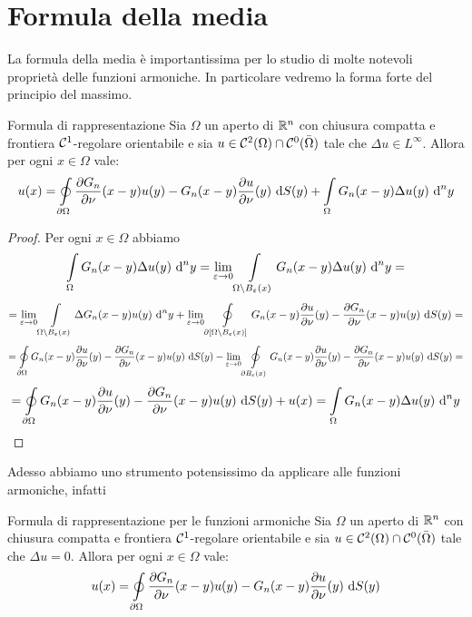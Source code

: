 \documentclass{book}
\begin{document}
\section{Formula della media}

La formula della media è importantissima per lo studio di molte notevoli proprietà delle funzioni armoniche. In particolare vedremo la forma forte del principio del massimo.

\begin{theorem}{Formula di rappresentazione}{}
    Sia $\Omega$ un aperto di $\mathbb{R}^n$ con chiusura compatta e frontiera $\mathcal{C}^1$-regolare orientabile e sia $u \in \mathcal{C}^2(\Omega)\cap\mathcal{C}^0(\bar{\Omega})$ tale che $\Delta u \in L^\infty$. Allora per ogni $x \in \Omega$ vale:
    \[u(x) = \oint\limits_{\partial\Omega} \frac{\partial G_n}{\partial \nu}(x-y) u(y) - G_n(x-y)\frac{\partial u}{\partial \nu}(y) \text{ d} S(y) + \int\limits_\Omega G_n(x-y)\Delta u(y)\text{ d}^n y\]
\end{theorem}
\begin{proof}
    Per ogni $x\in\Omega$ abbiamo
    \[\int\limits_\Omega G_n(x-y)\Delta u(y)\text{ d}^n y = \lim_{\varepsilon\to 0} \int\limits_{\Omega\setminus B_\varepsilon(x)} G_n(x-y)\Delta u(y)\text{ d}^n y =\]
    \[= \lim_{\varepsilon\to 0} \int\limits_{\Omega\setminus B_\varepsilon(x)}\Delta G_n(x-y) u(y)\text{ d}^n y + \lim_{\varepsilon\to 0}\oint\limits_{\partial[\Omega\setminus B_\varepsilon(x)]} G_n(x-y)\frac{\partial u}{\partial \nu}(y) - \frac{\partial G_n}{\partial \nu}(x-y) u(y) \text{ d} S(y) = \]
    \[= \oint\limits_{\partial\Omega} G_n(x-y)\frac{\partial u}{\partial \nu}(y) - \frac{\partial G_n}{\partial \nu}(x-y) u(y) \text{ d} S(y) - \lim_{\varepsilon\to 0}\oint\limits_{\partial B_\varepsilon(x)} G_n(x-y)\frac{\partial u}{\partial \nu}(y) - \frac{\partial G_n}{\partial \nu}(x-y) u(y) \text{ d} S(y) = \]
    \[= \oint\limits_{\partial\Omega} G_n(x-y)\frac{\partial u}{\partial \nu}(y) - \frac{\partial G_n}{\partial \nu}(x-y) u(y) \text{ d} S(y) + u(x) = \int\limits_\Omega G_n(x-y)\Delta u(y)\text{ d}^n y\]
\end{proof}

Adesso abbiamo uno strumento potensissimo da applicare alle funzioni armoniche, infatti

\begin{corollary}{Formula di rappresentazione per le funzioni armoniche}{}
    Sia $\Omega$ un aperto di $\mathbb{R}^n$ con chiusura compatta e frontiera $\mathcal{C}^1$-regolare orientabile e sia $u \in \mathcal{C}^2(\Omega)\cap\mathcal{C}^0(\bar{\Omega})$ tale che $\Delta u = 0$. Allora per ogni $x \in \Omega$ vale:
    \[u(x) = \oint\limits_{\partial\Omega} \frac{\partial G_n}{\partial \nu}(x-y) u(y) - G_n(x-y)\frac{\partial u}{\partial \nu}(y) \text{ d} S(y)\]
\end{corollary}
\end{document}
